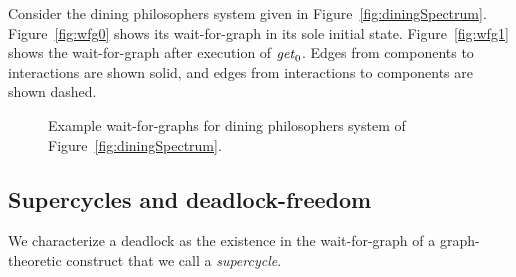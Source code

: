 
Consider the dining philosophers system given in Figure~\ref{fig:diningSpectrum}.  Figure~\ref{fig:wfg0} shows its
wait-for-graph in its sole initial state.  Figure~\ref{fig:wfg1} shows the wait-for-graph after execution of $\mathit{get}_0$.
Edges from components to interactions are shown solid, and edges from interactions to components are shown dashed.

\begin{figure*}[ht]
  \begin{center}
       \quad
      \caption{Example wait-for-graphs for dining philosophers system of Figure~\ref{fig:diningSpectrum}.}
       \label{fig:wfg}
  \end{center}
\end{figure*}





\subsection{Supercycles and deadlock-freedom}

We characterize a deadlock as the existence in the wait-for-graph of a
graph-theoretic construct that we call a {\em supercycle}.

